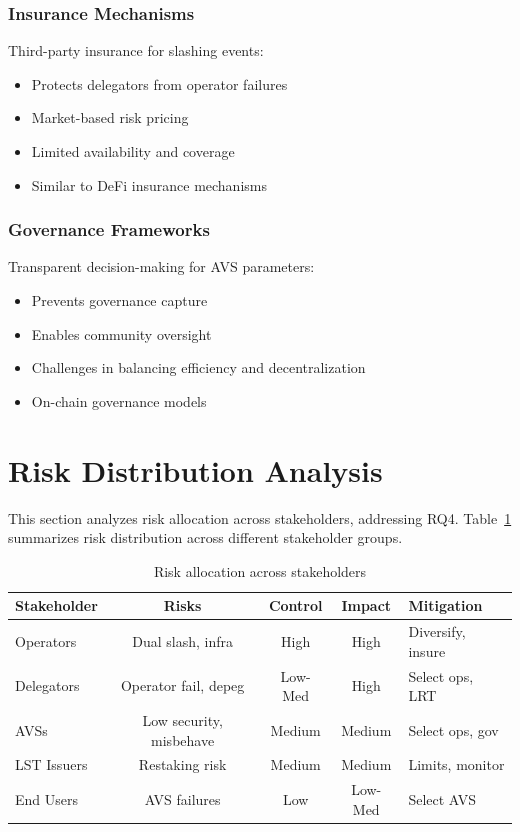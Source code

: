 \documentclass[runningheads]{llncs}
\begin{document}
\subsubsection{Insurance Mechanisms}

Third-party insurance for slashing events:
\begin{itemize}
    \item Protects delegators from operator failures
    \item Market-based risk pricing
    \item Limited availability and coverage
    \item Similar to DeFi insurance mechanisms~\cite{chen2021sok}
\end{itemize}

\subsubsection{Governance Frameworks}

Transparent decision-making for AVS parameters:
\begin{itemize}
    \item Prevents governance capture~\cite{chen2022rollup}
    \item Enables community oversight
    \item Challenges in balancing efficiency and decentralization
    \item On-chain governance models~\cite{eigenlayer2024}
\end{itemize}

\vspace{-0.3cm}
\section{Risk Distribution Analysis}
\label{sec:risk_distribution}

This section analyzes risk allocation across stakeholders, addressing RQ4. Table~\ref{tab:risk_allocation} summarizes risk distribution across different stakeholder groups.

\begin{table}[!ht]
    \centering
    \scriptsize
    \caption{Risk allocation across stakeholders}
    \label{tab:risk_allocation}
    \begin{tabular}{lcccp{2.5cm}}
        \toprule
        \textbf{Stakeholder} & \textbf{Risks} & \textbf{Control} & \textbf{Impact} & \textbf{Mitigation} \\
        \midrule
        Operators & Dual slash, infra & High & High & Diversify, insure \\
        Delegators & Operator fail, depeg & Low-Med & High & Select ops, LRT \\
        AVSs & Low security, misbehave & Medium & Medium & Select ops, gov \\
        LST Issuers & Restaking risk & Medium & Medium & Limits, monitor \\
        End Users & AVS failures & Low & Low-Med & Select AVS \\
        \bottomrule
    \end{tabular}
\end{table}
\end{document}
